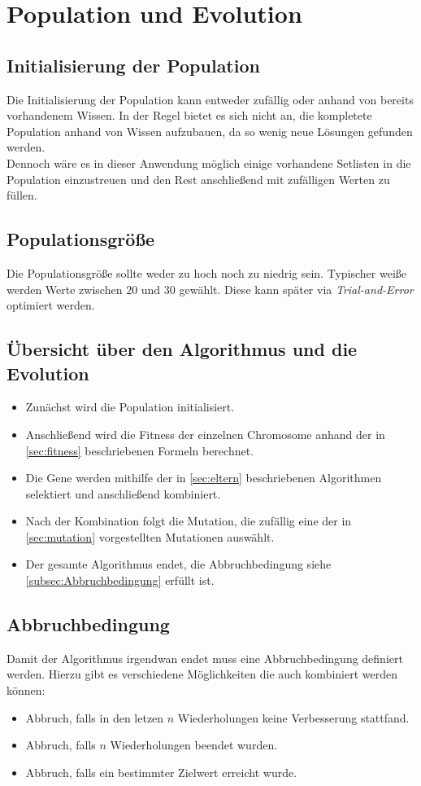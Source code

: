\section{Population und Evolution}\label{sec:popEv}
\subsection{Initialisierung der Population}
Die Initialisierung der Population kann entweder zufällig oder anhand von bereits vorhandenem Wissen.
In der Regel bietet es sich nicht an, die kompletete Population anhand von Wissen aufzubauen, da so
wenig neue Lösungen gefunden werden.\\
Dennoch wäre es in dieser Anwendung möglich einige vorhandene Setlisten in die Population einzustreuen und den Rest
anschließend mit zufälligen Werten zu füllen.

\subsection{Populationsgröße}
Die Populationsgröße sollte weder zu hoch noch zu niedrig sein. Typischer weiße werden Werte zwischen
20 und 30 gewählt. Diese kann später via \textit{Trial-and-Error} optimiert werden.

\subsection{Übersicht über den Algorithmus und die Evolution}

\begin{itemize}
    \item Zunächst wird die Population initialisiert.
    \item Anschließend wird die Fitness der einzelnen Chromosome anhand der in \autoref{sec:fitness} beschriebenen
        Formeln berechnet.
    \item Die Gene werden mithilfe der in \autoref{sec:eltern} beschriebenen Algorithmen selektiert und anschließend
        kombiniert.
    \item Nach der Kombination folgt die Mutation, die zufällig eine der in \autoref{sec:mutation} vorgestellten
    Mutationen auswählt.
    \item Der gesamte Algorithmus endet, die Abbruchbedingung siehe \autoref{subsec:Abbruchbedingung} erfüllt ist.
\end{itemize}

\subsection{Abbruchbedingung}\label{subsec:Abbruchbedingung}
Damit der Algorithmus irgendwan endet muss eine Abbruchbedingung definiert werden.
Hierzu gibt es verschiedene Möglichkeiten die auch kombiniert werden können:
\begin{itemize}
    \item Abbruch, falls in den letzen $n$ Wiederholungen keine Verbesserung stattfand.
    \item Abbruch, falls $n$ Wiederholungen beendet wurden.
    \item Abbruch, falls ein bestimmter Zielwert erreicht wurde.
\end{itemize}

